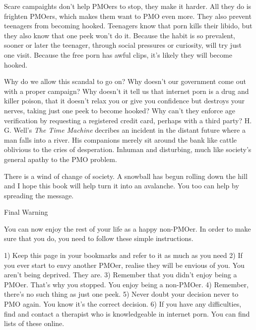Scare campaights don't help PMOers to stop, they make it harder. All they do is frighten PMOers, which makes them want to PMO even more. They also prevent teenagers from becoming hooked. Teenagers know that porn kills their libido, but they also know that one peek won't do it. Because the habit is so prevalent, sooner or later the teenager, through social pressures or curiosity, will try just one visit. Because the free porn has awful clips, it's likely they will become hooked.

Why do we allow this scandal to go on? Why doesn't our government come out with a proper campaign? Why doesn't it tell us that internet porn is a drug and killer poison, that it doesn't relax you or give you confidence but destroys your nerves, taking just one peek to become hooked? Why can't they enforce age verification by requesting a registered credit card, perhaps with a third party? H. G. Well's \textit{The Time Machine} decribes an incident in the distant future where a man falls into a river. His companions merely sit around the bank like cattle oblivious to the cries of desperation. Inhuman and disturbing, much like society's general apathy to the PMO problem.

There is a wind of change of society. A snowball has begun rolling down the hill and I hope this book will help turn it into an avalanche. You too can help by spreading the message.

Final Warning

You can now enjoy the rest of your life as a happy non-PMOer. In order to make sure that you do, you need to follow these simple instructions.

  1) Keep this page in your bookmarks and refer to it as much as you need
  2) If you ever start to envy another PMOer, realise they will be envious of you. You aren't being deprived. They are.
  3) Remember that you didn't enjoy being a PMOer. That's why you stopped. You enjoy being a non-PMOer.
  4) Remember, there's no such thing as just one peek.
  5) Never doubt your decision never to PMO again. You know it's the correct decision.
  6) If you have any difficulties, find and contact a therapist who is knowledgeable in internet porn. You can find lists of these online.
